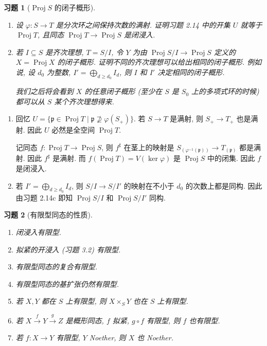\documentclass{article}
\theoremstyle{exercise}
\newtheorem{exercise}{习题}[section]
\newenvironment{proofc}{\proof}{\endproof}
\def\gp{\mathfrak{p}}
\def\Proj{\operatorname{Proj}}
\def\geq{\geqslant}
\begin{document}
\begin{exercise}[$\Proj S$ 的闭子概形]
  \begin{enumerate}[label={(\alph*)}]
    \item 设 $\varphi \colon S \to T$ 是分次环之间保持次数的满射.
          证明习题 2.14 中的开集 $U$ 就等于 $\Proj T$,
          且同态 $\Proj T \to \Proj S$ 是闭浸入.
    \item 若 $I \subseteq S$ 是齐次理想, $T = S / I$,
          令 $Y$ 为由 $\Proj S / I \to \Proj S$ 定义的 $X = \Proj X$ 的闭子概形.
          证明不同的齐次理想可以给出相同的闭子概形.
          例如说, 设 $d_0$ 为整数, $I' = \bigoplus_{d \geq d_0} I_d$,
          则 $I$ 和 $I'$ 决定相同的闭子概形.

          我们之后将会看到 $X$ 的任意闭子概形 (至少在 $S$ 是 $S_0$ 上的多项式环的时候)
          都可以从 $S$ 某个齐次理想得来.
  \end{enumerate}
\end{exercise}

\begin{proofc}
  \begin{enumerate}[label={(\alph*)}]
    \item 回忆 $U = \{ \gp \in \Proj T \mid \gp \not\supseteq \varphi(S_+) \}$.
          若 $S \to T$ 是满射, 则 $S_+ \to T_+$ 也是满射. 因此 $U$ 必然是全空间 $\Proj T$.

          记同态 $f \colon \Proj T \to \Proj S$,
          则 $f^\sharp$ 在茎上的映射是 $S_{(\varphi^{-1}(\gp))} \to T_{(\gp)}$ 都是满射.
          因此 $f^\sharp$ 是满射.
          而 $f(\Proj T) = V(\ker \varphi)$ 是 $\Proj S$ 中的闭集.
          因此 $f$ 是闭浸入.
    \item 若 $I' = \bigoplus_{d \geq d_0} I_d$,
          则 $S / I \to S / I'$ 的映射在不小于 $d_0$ 的次数上都是同构.
          因此由习题 2.14c 即知 $\Proj S / I$ 和 $\Proj S / I'$ 同构.
          \qedhere
  \end{enumerate}
\end{proofc}

\begin{exercise}[有限型同态的性质]
  \begin{enumerate}[label={(\alph*)}]
    \item 闭浸入有限型.
    \item 拟紧的开浸入 (习题 3.2) 有限型.
    \item 有限型同态的复合有限型.
    \item 有限型同态的基扩张仍然有限型.
    \item 若 $X, Y$ 都在 $S$ 上有限型, 则 $X \times_S Y$ 也在 $S$ 上有限型.
    \item 若 $X \xrightarrow{f} Y \xrightarrow{g} Z$ 是概形同态,
          $f$ 拟紧, $g \circ f$ 有限型, 则 $f$ 也有限型.
    \item 若 $f \colon X \to Y$ 有限型, $Y$ Noether, 则 $X$ 也 Noether.
  \end{enumerate}
\end{exercise}
\end{document}

